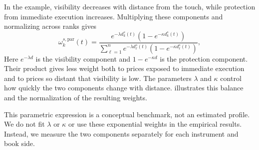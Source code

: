 \documentclass[11pt]{article}
\begin{document}
In the example, visibility decreases with distance from the touch, while protection from immediate execution increases.
Multiplying these components and normalizing across ranks gives
\begin{equation}
    \omega^{s,\mathrm{par}}_{k}(t)
    =
    \frac{
        e^{-\lambda d^{s}_{k}(t)}
        \left(1-e^{-\kappa d^{s}_{k}(t)}\right)
    }{
        \sum_{\ell=1}^{n}
        e^{-\lambda d^{s}_{\ell}(t)}\left(
        1-e^{-\kappa d^{s}_{\ell}(t)}\right)
    },
    \label{eq:depth_kernel}
\end{equation}
Here $e^{-\lambda d}$ is the visibility component and $1-e^{-\kappa d}$ is the protection component. Their product
gives less weight both to prices exposed to immediate execution and to prices so distant that visibility is low.
The parameters $\lambda$ and $\kappa$ control how quickly the two components change with distance.
 illustrates this balance and the normalization of the resulting weights.

This parametric expression is a conceptual benchmark, not an estimated profile. We do not fit $\lambda$ or $\kappa$ or
use these exponential weights in the empirical results. Instead, we measure the two components separately for each
instrument and book side.
\end{document}
